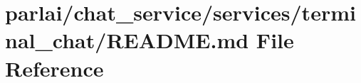 \hypertarget{parlai_2chat__service_2services_2terminal__chat_2README_8md}{}\section{parlai/chat\+\_\+service/services/terminal\+\_\+chat/\+R\+E\+A\+D\+ME.md File Reference}
\label{parlai_2chat__service_2services_2terminal__chat_2README_8md}
